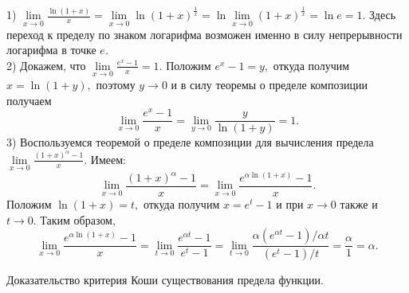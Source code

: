 \begin{example}
    1) $\lim\limits_{x\rightarrow0}
        \frac{\ln(1+x)}{x}=
        \lim\limits_{x\rightarrow0}
        \ln\left(1+x\right)^{\frac{1}{x}}=
        \ln\lim\limits_{x\rightarrow0}
        \left(1+x\right)^{\frac{1}{x}}=\ln e=1.$
    Здесь переход к пределу по знаком
    логарифма возможен именно в силу
    непрерывности логарифма в точке $e.$\\
    2) Докажем, что
    $\lim\limits_{x\rightarrow0}
        \frac{e^x-1}{x}=1.$ Положим $e^x-1=y,$
    откуда получим $x=\ln(1+y),$ поэтому
    $y\rightarrow0$ и
    в силу теоремы о пределе композиции
    получаем
    $$
        \lim\limits_{x\rightarrow0}
        \frac{e^x-1}{x}=\lim\limits_{y\rightarrow0}
        \frac{y}{\ln(1+y)}=1.
    $$
    3) Воспользуемся теоремой о пределе
    композиции для вычисления предела
    $\lim\limits_{x\rightarrow0}
        \frac{(1+x)^{\alpha}-1}{x}.$
    Имеем:
    $$
        \lim\limits_{x\rightarrow0}
        \frac{(1+x)^{\alpha}-1}{x}=
        \lim\limits_{x\rightarrow0}
        \frac{e^{\alpha\ln(1+x)}-1}{x}.
    $$
    Положим $\ln(1+x)=t,$ откуда
    получим $x=e^t-1$ и при $x\rightarrow0$
    также и $t\rightarrow0.$ Таким образом,
    $$
        \lim\limits_{x\rightarrow0}
        \frac{e^{\alpha\ln(1+x)}-1}{x}=
        \lim\limits_{t\rightarrow0}
        \frac{e^{\alpha t}-1}{e^t-1}=
        \lim\limits_{t\rightarrow0}
        \frac{\alpha(e^{\alpha t}-1)/\alpha t}
        {(e^t-1)/t}=\frac{\alpha}{1}=\alpha.
    $$
\end{example}

\newpage
\begin{problem}
Доказательство критерия Коши существования предела функции.
\end{problem}


